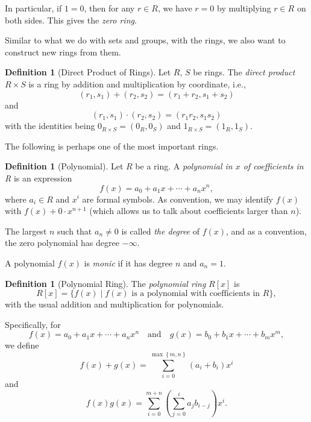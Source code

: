 \documentclass{article}
\theoremstyle{definition}
\newtheorem{definition}[theorem]{Definition}
\theoremstyle{remark}
\newcommand{\pqty}[1]{\left(#1\right)}
\newcommand{\bqty}[1]{\left[#1\right]}
\newcommand{\Bqty}[1]{\left\{#1\right\}}
\newcommand{\set}[2]{\{#1\mid #2\}}
\newcommand{\qand}{\quad\text{and}\quad}
\newcommand{\minusinfty}{-\infty}
\begin{document}
In particular, if \(1 = 0\), then for any \(r \in R\), we have \(r = 0\) by multiplying \(r \in R\) on both sides. This gives the \emph{zero ring}.

Similar to what we do with sets and groups, with the rings, we also want to construct new rings from them.

\begin{definition}[Direct Product of Rings]
    \label{def:direct-product-ring}%
    Let \(R\), \(S\) be rings. The \emph{direct product} \(R \times S\) is a ring by addition and multiplication by coordinate, i.e.,
    \[
        \pqty{r_1, s_1} + \pqty{r_2, s_2} = \pqty{r_1 + r_2, s_1 + s_2}
    \]
    and
    \[
        \pqty{r_1, s_1} \cdot \pqty{r_2, s_2} = \pqty{r_1 r_2, s_1 s_2}
    \]
    with the identities being \(0_{R \times S} = \pqty{0_R, 0_S}\) and \(1_{R \times S} = \pqty{1_R, 1_S}\).
\end{definition}

The following is perhaps one of the most important rings.

\begin{definition}[Polynomial]
    \label{def:polynomial}%
    Let \(R\) be a ring. A \emph{polynomial in \(x\) of coefficients in R} is an expression
    \[
    f\pqty{x} = a_0 + a_1 x + \cdots + a_n x^n,
    \]
    where \(a_i \in R\) and \(x^i\) are formal symbols. As convention, we may identify \(f\pqty{x}\) with \(f\pqty{x} + 0 \cdot x^{n + 1}\) (which allows us to talk about coefficients larger than \(n\)).
    
    The largest \(n\) such that \(a_n \neq 0\) is called \emph{the degree} of \(f\pqty{x}\), and as a convention, the zero polynomial has degree \(\minusinfty\).

    A polynomial \(f\pqty{x}\) is \emph{monic} if it has degree \(n\) and \(a_n = 1\).
\end{definition}

\begin{definition}[Polynomial Ring]
    \label{def:polynomial-ring}%
    The \emph{polynomial ring} \(R\bqty{x}\) is
    \[
        R \bqty{x} = \set{f\pqty{x}}{f\pqty{x} \text{ is a polynomial with coefficients in }R},
    \]
    with the usual addition and multiplication for polynomials.
    
    Specifically, for
    \[
        f\pqty{x} = a_0 + a_1 x + \cdots + a_n x^n \qand g\pqty{x} = b_0 + b_1 x + \cdots + b_m x^m,
    \]
    we define
    \[
        f\pqty{x} + g\pqty{x} = \sum_{i = 0}^{\max\Bqty{m, n}} \pqty{a_i + b_i} x^i
    \]
    and
    \[
        f\pqty{x} g\pqty{x} = \sum_{i = 0}^{m + n} \pqty{\sum_{j = 0}^{i} a_j b_{i - j}} x^i.
    \]
\end{definition}
\end{document}
